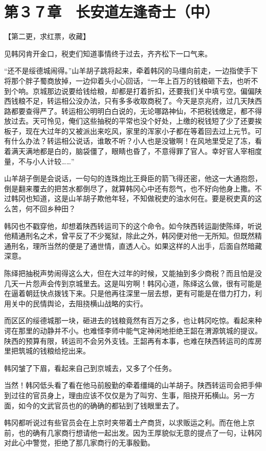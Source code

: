 \section{第３７章　长安道左逢奇士（中）}

【第二更，求红票，收藏】

见韩冈肯开金口，税吏们知道事情终于过去，齐齐松下一口气来。

“还不是绥德城闹得。”山羊胡子跳将起来，牵着韩冈的马缰向前走，一边指使手下将那个胖子蜀商放掉，一边仰着头小心回话，“一年上百万的钱粮砸下去，也听不到个响。京城那边说要给钱给粮，却都是打着折扣，还要我们关中填亏空。偏偏陕西钱粮不足，转运相公没办法，只有多多收取商税了。今天是京兆府，过几天陕西路都要查得严了。转运相公明明白白说的，无论哪路神仙，不把税钱缴足，都不得放过去。天可怜见，俺们这些抽税的平常也没个好处，上缴的税钱短了少了还要挨板子，现在大过年的又被派出来吃风，家里的浑家小子都在等着回去过上元节。可有什么办法？转运相公说话，谁敢不听？小人也是没辙啊！在风地里受足了冻，看着满天满地都是白的，脑袋僵了，眼睛也昏了，不意得罪了官人。幸好官人宰相度量，不与小人计较……”

山羊胡子倒是会说话，一句句的连珠炮比王舜臣的箭飞得还密，他这一大通抱怨，倒是翻来覆去的把苦水都倒尽了，就算韩冈心中还有怨气，也不好向他身上撒。不过韩冈也知道，这是山羊胡子欺他年轻，不知做税吏的油水何在。要是税吏真的这么苦，何不回乡种田？

韩冈也不戳穿他，却想着陕西转运司下的这个命令。如今陕西转运副使陈绎，听说他精通刑名之术，曾平反了不少冤狱，除此之外，韩冈便对他一无所知。但既然精通刑名，理所当然的便是了通世情，直透人心。如果这样的人出手，后面自然暗藏深意。

陈绎把抽税声势闹得这么大，但在大过年的时候，又能抽到多少商税？而且怕是没几天一片怨声会传到京城里去。这是叫穷啊！韩冈心道，陈绎这么做，很有可能是在逼着朝廷快点拨钱下来。只是他再往深里一层去想，更有可能是在借力打力，利用关中的民情舆论，去阻挠横山战略的实行。

而区区的绥德城那一块，砸进去的钱粮竟然有百万之多，也让韩冈吃惊。看起来种谔在那里的动静并不小。也难怪李师中能气定神闲地拒绝王韶在渭源筑城的提议。陕西的预算有限，转运司不会另外支钱。王韶再有本事，也难在陕西转运司的库房里把筑城的钱粮给挖出来。

韩冈皱了下眉，看起来自己到京城去，又多了个任务。

当然！韩冈低头看了看在他马前殷勤的牵着缰绳的山羊胡子。陕西转运司会把手伸到过往的官员身上，理由应该不仅仅是为了叫穷、生事，阻挠开拓横山。另一方面，如今的文武官员也的的确确的都钻到了钱眼里去了。

韩冈都听说过有些官员会在上京时夹带着土产商货，以求贩运之利。而在他上京前，也的确有几家商行想请他一起出发。因为王厚貌似无意的提点了一句，让韩冈对此心中警觉，拒绝了那几家商行的无事殷勤。

